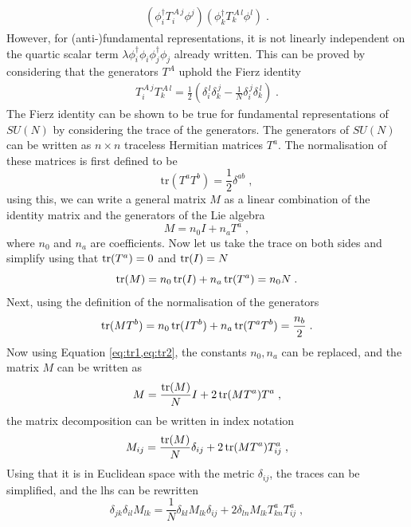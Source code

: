 \begin{align}
    (\phi_i^\dagger T_i ^{\,A\,j}\phi^j)(\phi_k^\dagger T_k ^{\,A\,l}\phi^l)\;.
\end{align}
However, for (anti-)fundamental representations, it is not linearly independent on the quartic scalar term $\lambda \phi^\dagger_i \phi_i \phi^\dagger_j \phi_j $  already written. This can be proved by considering that the generators $T^A$ uphold the Fierz identity
\begin{align}
    T_i ^{\,A\,j}T_k ^{\,A\,l}=\frac{1}{2}\left(\delta_i^{\,l}\delta_k^{\,j}-\frac{1}{N}\delta_i^{\,j}\delta_k^{\,l}\right) \;.
\end{align}
The Fierz identity can be shown to be true for fundamental representations of $SU(N)$ by considering the trace of the generators. The generators of $SU(N)$ can be written as $n\times n $ traceless Hermitian matrices $T^a$. The normalisation of these matrices is first defined to be 
\begin{equation}
      \text{tr}(T^a T^b)=\frac{1}{2}\delta^{ab}\;,
\end{equation}
using this, we can write a general matrix $M$ as a linear combination of the identity matrix and the generators of the Lie algebra
\begin{equation}
      M=n_0 I+n_aT^a\;,
\end{equation}
where $n_0$ and $n_a$ are coefficients. Now let us take the trace on both sides and simplify using that $\operatorname{tr}(T^a)=0$ and $\operatorname{tr}(I)=N$
\begin{equation}
      \operatorname{tr}(M)=n_0 \operatorname{tr}(I)+n_a\operatorname{tr}(T^a)=n_0N\;.\label{eq:tr1}
\end{equation}
Next, using the definition of the normalisation of the generators
\begin{equation}
      \operatorname{tr}(MT^b)=n_0 \operatorname{tr}(IT^b)+n_a\operatorname{tr}(T^aT^b)=\frac{n_b}{2}\;.\label{eq:tr2}
\end{equation}
Now using Equation \ref{eq:tr1,eq:tr2}, the constants $n_0,n_a$ can be replaced, and the matrix $M$ can be written as
\begin{equation}
      M=\frac{\operatorname{tr}(M)}{N} I+2\operatorname{tr}(MT^a)T^a\;,
\end{equation}
the matrix decomposition can be written in index notation
\begin{equation}
      M_{ij}=\frac{\operatorname{tr}(M)}{N} \delta_{ij}+2\operatorname{tr}(MT^a)T^a_{ij}\;,
\end{equation}
Using that it is in Euclidean space with the metric $\delta_{ij}$, the traces can be simplified, and the lhs can be rewritten
\begin{equation}
      \delta_{jk}\delta_{il}M_{lk}=\frac{1}{N} \delta_{kl}M_{lk}\delta_{ij}+2\delta_{ln}M_{lk}T^a_{kn}T^a_{ij}\;,
\end{equation}
